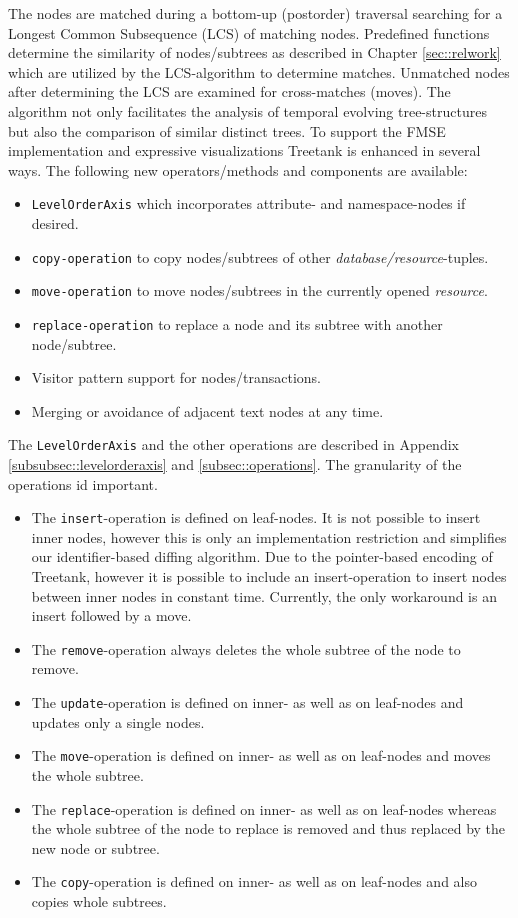 The nodes are matched during a bottom-up (postorder) traversal searching for a Longest Common Subsequence (LCS) of matching nodes. Predefined functions determine the similarity of nodes/subtrees as described in Chapter \ref{sec::relwork} which are utilized by the LCS-algorithm to determine matches. Unmatched nodes after determining the LCS are examined for cross-matches (moves). The algorithm not only facilitates the analysis of temporal evolving tree-structures but also the comparison of similar distinct trees. To support the FMSE implementation and expressive visualizations Treetank is enhanced in several ways. The following new operators/methods and components are available:

\begin{itemize}
\item \texttt{LevelOrderAxis} which incorporates attribute- and namespace-nodes if desired.
\item \texttt{copy-operation} to copy nodes/subtrees of other \emph{database/resource}-tuples.
\item \texttt{move-operation} to move nodes/subtrees in the currently opened \emph{resource}.
\item \texttt{replace-operation} to replace a node and its subtree with another node/subtree.
\item Visitor pattern support for nodes/transactions.
\item Merging or avoidance of adjacent text nodes at any time.
\end{itemize}

The \texttt{LevelOrderAxis} and the other operations are described in Appendix \ref{subsubsec::levelorderaxis} and \ref{subsec::operations}. The granularity of the operations id important. 

\begin{itemize}
\item The \texttt{insert}-operation is defined on leaf-nodes. It is not possible to insert inner nodes, however this is only an implementation restriction and simplifies our identifier-based diffing algorithm. Due to the pointer-based encoding of Treetank, however it is possible to include an insert-operation to insert nodes between inner nodes in constant time. Currently, the only workaround is an insert followed by a move.
\item The \texttt{remove}-operation always deletes the whole subtree of the node to remove.
\item The \texttt{update}-operation is defined on inner- as well as on leaf-nodes and updates only a single nodes.
\item The \texttt{move}-operation is defined on inner- as well as on leaf-nodes and moves the whole subtree.
\item The \texttt{replace}-operation is defined on inner- as well as on leaf-nodes whereas the whole subtree of the node to replace is removed and thus replaced by the new node or subtree.
\item The \texttt{copy}-operation is defined on inner- as well as on leaf-nodes and also copies whole subtrees.
\end{itemize}

